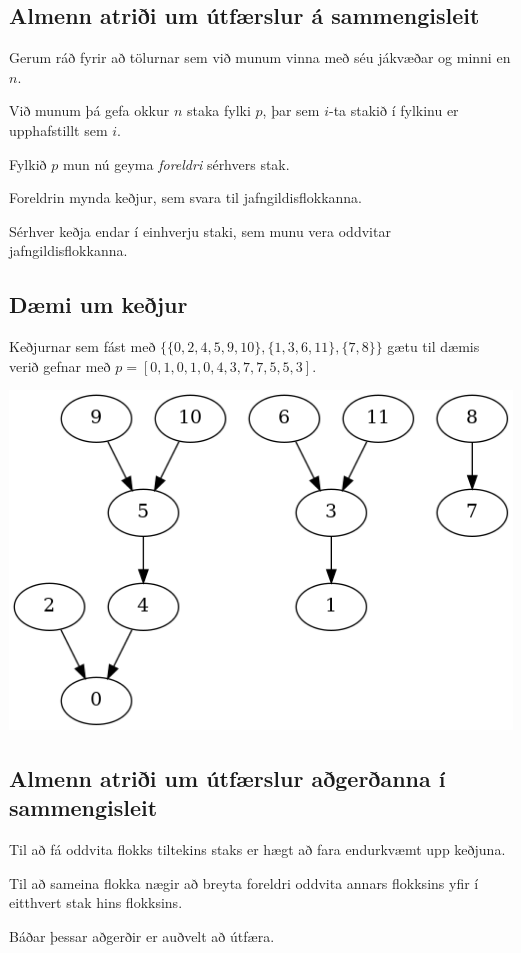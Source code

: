 \subsection{Almenn atriði um útfærslur á sammengisleit}
{
    {
        \item<1-> Gerum ráð fyrir að tölurnar sem við munum vinna með séu jákvæðar og minni en $n$.
        \item<2-> Við munum þá gefa okkur $n$ staka fylki $p$, þar sem $i$-ta stakið í fylkinu er upphafstillt sem $i$.
        \item<3-> Fylkið $p$ mun nú geyma \emph{foreldri} sérhvers stak.
        \item<4-> Foreldrin mynda keðjur, sem svara til jafngildisflokkanna.
        \item<5-> Sérhver keðja endar í einhverju staki, sem munu vera oddvitar jafngildisflokkanna.
    }
}

\subsection{Dæmi um keðjur}
{
    {
        \item<1-> Keðjurnar sem fást með $\{\{0, 2, 4, 5, 9, 10\}, \{1, 3, 6, 11\}, \{7, 8\}\}$ gætu til dæmis verið gefnar með
                    $p = [0, 1, 0, 1, 0, 4, 3, 7, 7, 5, 5, 3]$.
        \item<2->[] \includegraphics[scale=0.5]{fig/mynd.png}
    }
}

\subsection{Almenn atriði um útfærslur aðgerðanna í sammengisleit}
{
    {
        \item<1-> Til að fá oddvita flokks tiltekins staks er hægt að fara endurkvæmt upp keðjuna.
        \item<2-> Til að sameina flokka nægir að breyta foreldri oddvita annars flokksins yfir í
            eitthvert stak hins flokksins.
        \item<3-> Báðar þessar aðgerðir er auðvelt að útfæra.
    }
}

